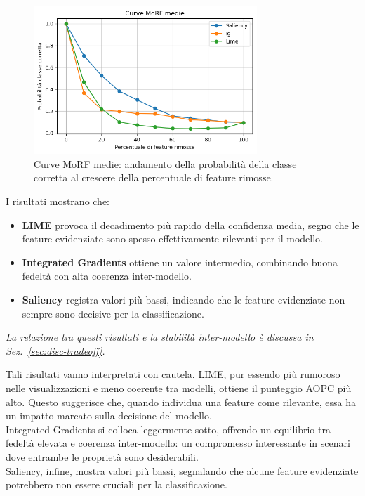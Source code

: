 \documentclass[12pt,a4paper,oneside]{report}
\numberwithin{figure}{chapter}
\numberwithin{table}{chapter}
\begin{document}
\begin{figure}[h!]
      \centering
      \includegraphics[width=0.75\textwidth]{images/grafMorf.png}
      \caption{Curve MoRF medie: andamento della probabilità della classe corretta al crescere della percentuale di feature rimosse.}
      \label{fig:morf_curves}
\end{figure}

\noindent
I risultati mostrano che:
\begin{itemize}
      \item \textbf{LIME} provoca il decadimento più rapido della confidenza media, segno che le feature evidenziate sono spesso effettivamente rilevanti per il modello.
      \item \textbf{Integrated Gradients} ottiene un valore intermedio, combinando buona fedeltà con alta coerenza inter-modello.
      \item \textbf{Saliency} registra valori più bassi, indicando che le feature evidenziate non sempre sono decisive per la classificazione.
\end{itemize}
{\small\textit{La relazione tra questi risultati e la stabilità inter-modello è discussa in
      Sez.~\ref{sec:disc-tradeoff}.}}

\noindent
Tali risultati vanno interpretati con cautela. LIME, pur essendo più rumoroso nelle visualizzazioni e meno coerente tra modelli, ottiene il punteggio AOPC più alto. Questo suggerisce che, quando individua una feature come rilevante, essa ha un impatto marcato sulla decisione del modello. \\
Integrated Gradients si colloca leggermente sotto, offrendo un equilibrio tra fedeltà elevata e coerenza inter-modello: un compromesso interessante in scenari dove entrambe le proprietà sono desiderabili. \\
Saliency, infine, mostra valori più bassi, segnalando che alcune feature evidenziate potrebbero non essere cruciali per la classificazione.
\end{document}
